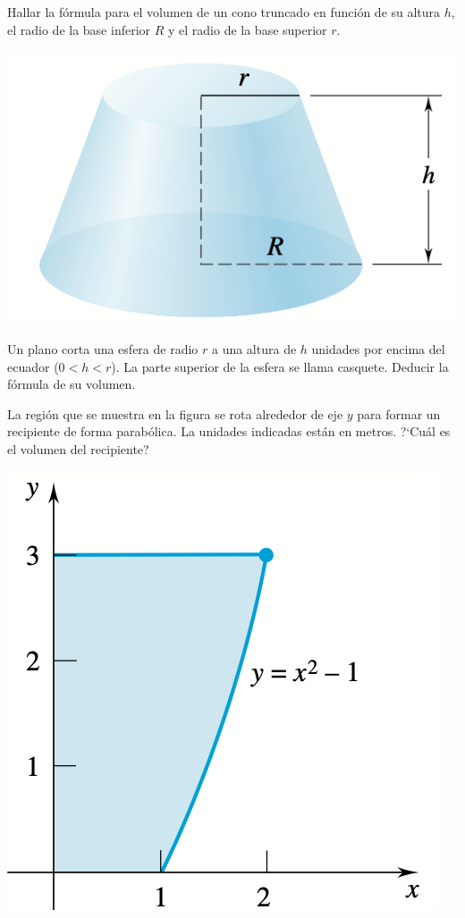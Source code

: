 \item Hallar la fórmula para el volumen de un cono truncado en
función de su altura $h$, el radio de la base inferior $R$ y el radio de
la base superior $r$.

\centerline{\includegraphics[width=.3\textwidth]{pics/cono-truncado.png}}

\item Un plano corta una esfera de radio $r$ a una altura de $h$ unidades
por encima del ecuador ($0 < h < r$). La parte superior de la
esfera se llama casquete. Deducir la fórmula de su volumen.

\item  La región que se muestra en la figura se rota alrededor de eje $y$
para formar un recipiente de forma parabólica. La unidades
indicadas están en metros. ?`Cuál es el volumen del recipiente?

\centerline{\includegraphics[width=.3\textwidth]{pics/recipiente-parabolico.png}}

